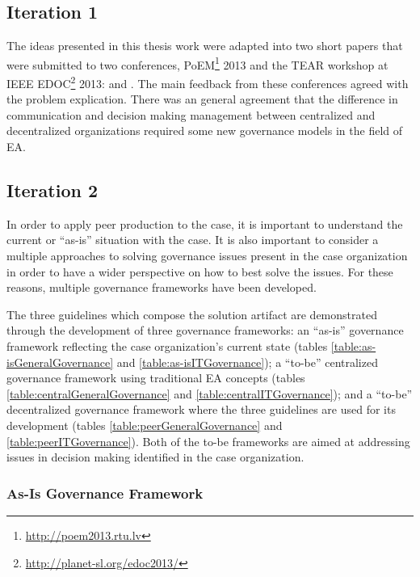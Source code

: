 \subsection{Iteration 1}

The ideas presented in this thesis work were adapted into two short papers that were submitted to two conferences, PoEM\footnote{\url{http://poem2013.rtu.lv}} 2013 and the TEAR workshop at IEEE EDOC\footnote{\url{http://planet-sl.org/edoc2013/}} 2013: \cite{speckert2013} and \cite{rychkova2013}. The main feedback from these conferences agreed with the problem explication. There was an general agreement that the difference in communication and decision making management between centralized and decentralized organizations required some new governance models in the field of EA. 

\subsection{Iteration 2}

In order to apply peer production to the case, it is important to understand the current or ``as-is'' situation with the case. It is also important to consider a multiple approaches to solving governance issues present in the case organization in order to have a wider perspective on how to best solve the issues.  For these reasons, multiple governance frameworks have been developed.

The three guidelines which compose the solution artifact are demonstrated through the development of three governance frameworks: an ``as-is'' governance framework reflecting the case organization's current state (tables \ref{table:as-isGeneralGovernance} and \ref{table:as-isITGovernance}); a ``to-be'' centralized governance framework using traditional EA concepts (tables \ref{table:centralGeneralGovernance} and \ref{table:centralITGovernance}); and a ``to-be'' decentralized governance framework where the three guidelines are used for its development (tables \ref{table:peerGeneralGovernance} and \ref{table:peerITGovernance}). Both of the to-be frameworks are aimed at addressing issues in decision making identified in the case organization. 

\subsubsection*{As-Is Governance Framework}

